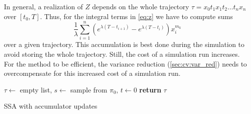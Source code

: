 In general, a realization of $Z$ depends on the whole trajectory $\tau=x_0t_1 x_1 t_2 \dots\allowbreak t_n x_n$ over $[t_0,T]$.
Thus, for the integral terms
in \eqref{eq:z} we have to compute sums
\begin{equation}\label{eq:dis_int}
    \frac{1}{\lambda}\sum_{i=1}^n\left(e^{\lambda(T - t_{i+1})}
    - e^{\lambda(T-t_i)}\right)x_i^{m_k}
\end{equation}
over a given trajectory.
This accumulation is best done during the simulation to avoid storing the whole trajectory.
Still, the cost of a simulation run increases.
For the method to be efficient, the variance reduction (\autoref{sec:cv:var_red}) needs
to overcompensate for this increased cost of a simulation run.
\begin{algorithm}
    $\tau \leftarrow$ empty list, $s\leftarrow$ sample from $\pi_0$, $t\leftarrow 0$\;
    \textbf{return} $\tau$\;
    \caption{\label{alg:ssa_lcv}\ac{SSA} with accumulator updates}
\end{algorithm}

